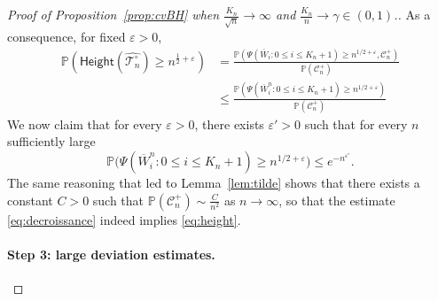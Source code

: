 \documentclass[AHL,XML,longabstracts,Unicode]{cedram}
\renewcommand{\P}{\mathbb{P}}
\def\eps{\varepsilon}
\def\Ts{\mathscr{T}}
\renewcommand{\epsilon}{\varepsilon}
\renewcommand\Pr[1]{\mathbb{P}\left(#1\right)}
\begin{document}
\begin{proof}[Proof of  Proposition~\ref{prop:cvBH}  when $\tfrac{K_{n}}{\sqrt{n}} \rightarrow \infty$ and $ \tfrac{K_{n}}{n}  \rightarrow \gamma \in (0,1)$.]
As a consequence, for fixed $\epsilon>0$,
\begin{align*}
\Pr{\mathsf{Height}(\hat{\Ts^{\circ}_{n}}) \geq n^{ \tfrac{1}{2} +\epsilon}} &= \frac{\Pr{\Psi( \overline{W}_{i} :0 \leq i \leq K_{n}+1) \geq n^{{1}/{2}+\epsilon},{ \mathcal{C}^{+}_{n} }}}{\Pr{ \mathcal{C}^{+}_{n} }} \\
& \leq  \frac{\Pr{\Psi( \overline{W}^{n}_{i} :0 \leq i \leq K_{n}+1) \geq n^{{1}/{2}+\epsilon}}}{\Pr{ \mathcal{C}^{+}_{n} }}
\end{align*}
 We now claim that for every $\eps>0$, there exists $\epsilon'>0$ such that for every $n$ sufficiently large
\begin{equation}
\label{eq:decroissance} \P\big(\Psi( \overline{W}^{n}_{i} :0 \leq i \leq K_{n}+1) \geq n^{{1}/{2}+\epsilon}
\big) \leq e^{-n^{\epsilon'}}.
\end{equation}
The same reasoning that led to Lemma~\ref{lem:tilde} shows that there exists a constant $C>0$ such that $\Pr{ \mathcal{C}^{+}_{n} } \sim \tfrac{C}{n^{2}}$ as $n \rightarrow \infty$, so that the estimate \eqref{eq:decroissance} indeed implies \eqref{eq:height}.


\paragraph*{Step 3: large deviation estimates.}



\end{proof}
\end{document}
